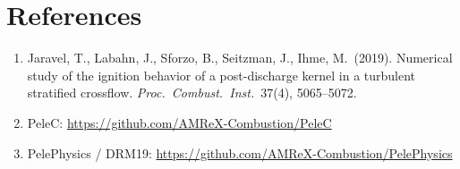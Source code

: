 \documentclass[11pt,a4paper]{article}
\begin{document}
\section*{References}
\begin{enumerate}[leftmargin=*]
\item Jaravel, T., Labahn, J., Sforzo, B., Seitzman, J., Ihme, M.\ (2019).
      Numerical study of the ignition behavior of a post-discharge kernel in a
      turbulent stratified crossflow. \emph{Proc.\ Combust.\ Inst.}\ 37(4), 5065--5072.
\item PeleC: \url{https://github.com/AMReX-Combustion/PeleC}
\item PelePhysics / DRM19: \url{https://github.com/AMReX-Combustion/PelePhysics}
\end{enumerate}
\end{document}
